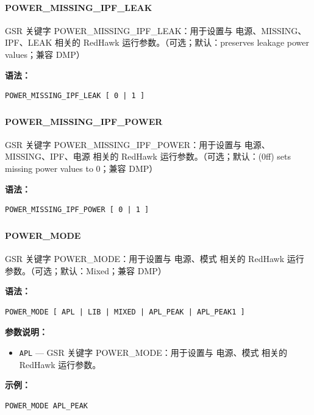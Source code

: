 \paragraph*{POWER_MISSING_IPF_LEAK}

GSR 关键字 POWER_MISSING_IPF_LEAK：用于设置与 电源、MISSING、IPF、LEAK 相关的 RedHawk 运行参数。（可选；默认：preserves leakage power values；兼容 DMP）

\textbf{语法：}
\begin{lstlisting}
POWER_MISSING_IPF_LEAK [ 0 | 1 ]
\end{lstlisting}

\subsubsection{}
\paragraph*{POWER_MISSING_IPF_POWER}

GSR 关键字 POWER_MISSING_IPF_POWER：用于设置与 电源、MISSING、IPF、电源 相关的 RedHawk 运行参数。（可选；默认：(0ff) sets missing power values to 0；兼容 DMP）

\textbf{语法：}
\begin{lstlisting}
POWER_MISSING_IPF_POWER [ 0 | 1 ]
\end{lstlisting}

\subsubsection{}
\paragraph*{POWER_MODE}

GSR 关键字 POWER_MODE：用于设置与 电源、模式 相关的 RedHawk 运行参数。（可选；默认：Mixed；兼容 DMP）

\textbf{语法：}
\begin{lstlisting}
POWER_MODE [ APL | LIB | MIXED | APL_PEAK | APL_PEAK1 ]
\end{lstlisting}

\textbf{参数说明：}
\begin{itemize}
\item \texttt{APL} — GSR 关键字 POWER\_MODE：用于设置与 电源、模式 相关的 RedHawk 运行参数。
\end{itemize}

\textbf{示例：}
\begin{lstlisting}
POWER_MODE APL_PEAK
\end{lstlisting}

